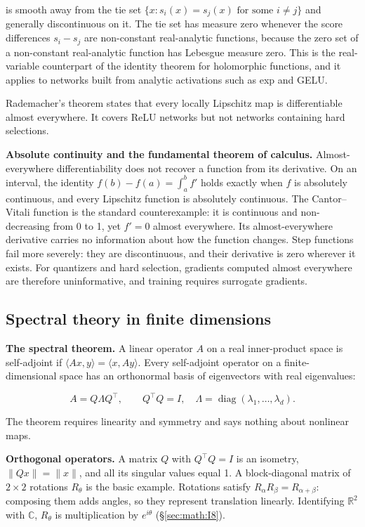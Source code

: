 is smooth away from the tie set \(\{x : s_i(x) = s_j(x) \text{ for some } i \neq j\}\)
and generally discontinuous on it. The tie set has measure zero whenever
the score differences \(s_i - s_j\) are non-constant real-analytic
functions, because the zero set of a non-constant real-analytic function
has Lebesgue measure zero. This is the real-variable counterpart of the
identity theorem for holomorphic functions, and it applies to networks
built from analytic activations such as exp and GELU.

Rademacher's theorem states that every locally Lipschitz map is
differentiable almost everywhere. It covers ReLU networks but not
networks containing hard selections.

\textbf{Absolute continuity and the fundamental theorem of calculus.}
Almost-everywhere differentiability does not recover a function from its
derivative. On an interval, the identity \(f(b) - f(a) = \int_a^b f'\)
holds exactly when \(f\) is absolutely continuous, and every Lipschitz
function is absolutely continuous. The Cantor--Vitali function is the
standard counterexample: it is continuous and non-decreasing from 0 to
1, yet \(f' = 0\) almost everywhere. Its almost-everywhere derivative
carries no information about how the function changes. Step functions
fail more severely: they are discontinuous, and their derivative is zero
wherever it exists. For quantizers and hard selection, gradients computed almost
everywhere are therefore uninformative, and training requires surrogate
gradients.

\subsection{Spectral theory in finite
dimensions}\label{sec:math:I3}

\textbf{The spectral theorem.} A linear operator \(A\) on a real
inner-product space is self-adjoint if \(\langle Ax, y\rangle = \langle x, Ay\rangle\). Every
self-adjoint operator on a finite-dimensional space has an orthonormal
basis of eigenvectors with real eigenvalues:

\[
A = Q \Lambda Q^\top, \qquad Q^\top Q = I, \quad \Lambda = \operatorname{diag}(\lambda_1, \dots, \lambda_d).
\]

The theorem requires linearity and symmetry and says nothing about
nonlinear maps.

\textbf{Orthogonal operators.} A matrix \(Q\) with \(Q^{\top}Q = I\) is an
isometry, \(\|Qx\| = \|x\|\), and all its singular values equal 1. A
block-diagonal matrix of \(2 \times 2\) rotations \(R_\theta\) is the basic example.
Rotations satisfy \(R_\alpha R_\beta = R_{\alpha+\beta}\): composing them adds angles, so
they represent translation linearly. Identifying \(\mathbb{R}^{2}\) with
\(\mathbb{C}\), \(R_\theta\) is multiplication by \(e^{i\theta}\) (\S\ref{sec:math:I8}).


